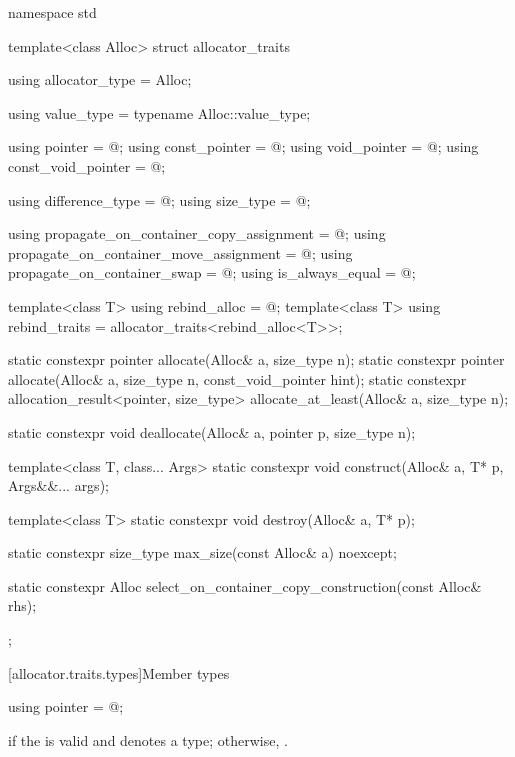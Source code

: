 %
\begin{codeblock}
namespace std {
  template<class Alloc> struct allocator_traits {
    using allocator_type     = Alloc;

    using value_type         = typename Alloc::value_type;

    using pointer            = @\seebelow@;
    using const_pointer      = @\seebelow@;
    using void_pointer       = @\seebelow@;
    using const_void_pointer = @\seebelow@;

    using difference_type    = @\seebelow@;
    using size_type          = @\seebelow@;

    using propagate_on_container_copy_assignment = @\seebelow@;
    using propagate_on_container_move_assignment = @\seebelow@;
    using propagate_on_container_swap            = @\seebelow@;
    using is_always_equal                        = @\seebelow@;

    template<class T> using rebind_alloc = @\seebelow@;
    template<class T> using rebind_traits = allocator_traits<rebind_alloc<T>>;

    static constexpr pointer allocate(Alloc& a, size_type n);
    static constexpr pointer allocate(Alloc& a, size_type n, const_void_pointer hint);
    static constexpr allocation_result<pointer, size_type>
      allocate_at_least(Alloc& a, size_type n);

    static constexpr void deallocate(Alloc& a, pointer p, size_type n);

    template<class T, class... Args>
      static constexpr void construct(Alloc& a, T* p, Args&&... args);

    template<class T>
      static constexpr void destroy(Alloc& a, T* p);

    static constexpr size_type max_size(const Alloc& a) noexcept;

    static constexpr Alloc select_on_container_copy_construction(const Alloc& rhs);
  };
}
\end{codeblock}

[allocator.traits.types]{Member types}

%
\begin{itemdecl}
using pointer = @\seebelow@;
\end{itemdecl}

\begin{itemdescr}
\pnum
\ctype {} if
the   is valid and denotes a
type; otherwise, .
\end{itemdescr}

